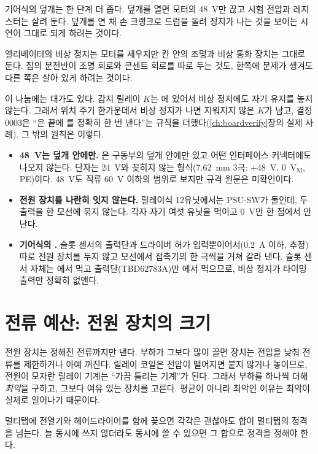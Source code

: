 기어식의 덮개는 한 단계 더 좁다. 덮개를 열면 모터의 48~V만 끊고 시험 전압과 레지스터는 살려 둔다. 덮개를 연 채 손
크랭크로 드럼을 돌려 정지가 나는 것을 보이는 시연이 그대로 되게 하려는 것이다.

\General 엘리베이터의 비상 정지는 모터를 세우지만 칸 안의 조명과 비상 통화 장치는 그대로 둔다. 집의 분전반이 조명
회로와 콘센트 회로를 따로 두는 것도, 한쪽에 문제가 생겨도 다른 쪽은 살아 있게 하려는 것이다.

\Ours 이 나눔에는 대가도 있다. 감지 릴레이 $K$는 에 있어서 비상 정지에도 자기 유지를 놓지 않는다. 그래서
위치 주기 한가운데서 비상 정지가 나면 지워지지 않은 $K$가 남고, 결정 0003은 ``은 끝에 를 정확히
한 번 낸다''는 규칙을 더했다(\ref{ch:boardverify}장의 실제 사례). 그 밖의 원칙은 이렇다.
\begin{itemize}
\item \textbf{48~V는 덮개 안에만.} 은 구동부의 덮개 안에만 있고 어떤 인터페이스 커넥터에도 나오지 않는다.
단자는 24~V와 꽂히지 않는 형식(7.62~mm 3극: +48~V, 0~V$_\mathrm{M}$, PE)이다. 48~V도 직류 60~V 이하의 범위로 보지만 규격
원문은 미확인이다.
\item \textbf{전원 장치를 나란히 잇지 않는다.} 릴레이식 12유닛에서는 PSU-SW가 둘인데, 두 출력을 한 모선에 묶지 않는다.
각자 자기 여섯 유닛을 먹이고 0~V만 한 점에서 만난다.
\item \textbf{기어식의 .} 슬롯 센서의 출력단과 드라이버 허가 입력뿐이어서(0.2~A 이하, 추정) 따로 전원
장치를 두지 않고  모선에서 접촉기의 한 극씩을 거쳐 갈라 낸다. 슬롯 센서 자체는 에서 먹고
출력단(TBD62783A)만 에서 먹으므로, 비상 정지가 타이밍 출력만 정확히 없앤다.
\end{itemize}

\section{전류 예산: 전원 장치의 크기}\label{sec:p-budget}

\Why 전원 장치는 정해진 전류까지만 낸다. 부하가 그보다 많이 끌면 장치는 전압을 낮춰 전류를 제한하거나 아예 꺼진다.
릴레이 코일은 전압이 떨어지면 붙지 않거나 놓이므로, 전원이 모자란 릴레이 기계는 ``가끔 틀리는 기계''가 된다. 그래서
부하를 하나씩 더해 \emph{최악}을 구하고, 그보다 여유 있는 장치를 고른다. 평균이 아니라 최악인 이유는 최악이 실제로
일어나기 때문이다.

\General 멀티탭에 전열기와 헤어드라이어를 함께 꽂으면 각각은 괜찮아도 합이 멀티탭의 정격을 넘는다. 늘 동시에 쓰지
않더라도 동시에 쓸 수 있으면 그 합으로 정격을 정해야 한다.

